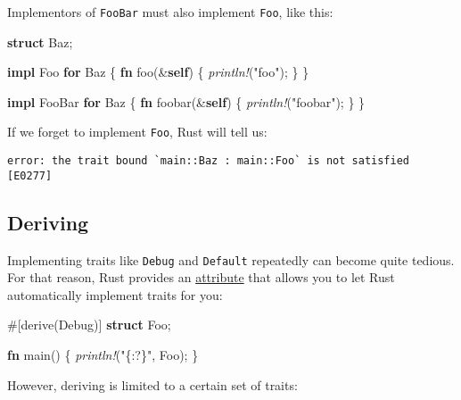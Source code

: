 \documentclass[a4paper,]{book}
\newenvironment{Shaded}{\begin{snugshade}}{\end{snugshade}}
\newcommand{\KeywordTok}[1]{\textcolor[rgb]{0.13,0.29,0.53}{\textbf{{#1}}}}
\newcommand{\StringTok}[1]{\textcolor[rgb]{0.31,0.60,0.02}{{#1}}}
\newcommand{\BuiltInTok}[1]{{#1}}
\newcommand{\PreprocessorTok}[1]{\textcolor[rgb]{0.56,0.35,0.01}{\textit{{#1}}}}
\newcommand{\AttributeTok}[1]{\textcolor[rgb]{0.77,0.63,0.00}{{#1}}}
\newcommand{\NormalTok}[1]{{#1}}
\begin{document}
Implementors of \texttt{FooBar} must also implement \texttt{Foo}, like
this:

\begin{Shaded}
\begin{Highlighting}[]
\KeywordTok{struct} \NormalTok{Baz;}

\KeywordTok{impl} \NormalTok{Foo }\KeywordTok{for} \NormalTok{Baz \{}
    \KeywordTok{fn} \NormalTok{foo(&}\KeywordTok{self}\NormalTok{) \{ }\PreprocessorTok{println!}\NormalTok{(}\StringTok{"foo"}\NormalTok{); \}}
\NormalTok{\}}

\KeywordTok{impl} \NormalTok{FooBar }\KeywordTok{for} \NormalTok{Baz \{}
    \KeywordTok{fn} \NormalTok{foobar(&}\KeywordTok{self}\NormalTok{) \{ }\PreprocessorTok{println!}\NormalTok{(}\StringTok{"foobar"}\NormalTok{); \}}
\NormalTok{\}}
\end{Highlighting}
\end{Shaded}

If we forget to implement \texttt{Foo}, Rust will tell us:

\begin{verbatim}
error: the trait bound `main::Baz : main::Foo` is not satisfied [E0277]
\end{verbatim}

\subsection{Deriving}\label{deriving}

Implementing traits like \texttt{Debug} and \texttt{Default} repeatedly
can become quite tedious. For that reason, Rust provides an
\protect\hyperlink{sec--attributes}{attribute} that allows you to let
Rust automatically implement traits for you:

\begin{Shaded}
\begin{Highlighting}[]
\AttributeTok{#[}\NormalTok{derive}\AttributeTok{(}\BuiltInTok{Debug}\AttributeTok{)]}
\KeywordTok{struct} \NormalTok{Foo;}

\KeywordTok{fn} \NormalTok{main() \{}
    \PreprocessorTok{println!}\NormalTok{(}\StringTok{"\{:?\}"}\NormalTok{, Foo);}
\NormalTok{\}}
\end{Highlighting}
\end{Shaded}

However, deriving is limited to a certain set of traits:
\end{document}
